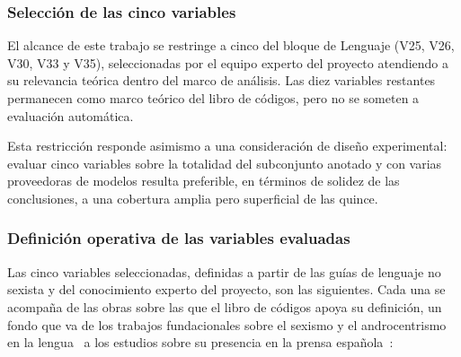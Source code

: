 \subsubsection{Selección de las cinco variables}

El alcance de este trabajo se restringe a cinco del bloque de Lenguaje (V25, V26, V30, V33 y
V35), seleccionadas por el equipo experto del proyecto atendiendo a su relevancia teórica dentro del marco de análisis. Las diez variables restantes permanecen como
marco teórico del libro de códigos, pero no se someten a evaluación automática.

Esta restricción responde asimismo a una consideración de diseño experimental:
evaluar cinco variables sobre la totalidad del subconjunto anotado y con varias
proveedoras de modelos resulta preferible, en términos de solidez de las
conclusiones, a una cobertura amplia pero superficial de las quince.

\subsubsection{Definición operativa de las variables evaluadas}
\label{sec:iris_variables}

Las cinco variables seleccionadas, definidas a partir de las guías de lenguaje no
sexista y del conocimiento experto del proyecto, son las siguientes. Cada una se
acompaña de las obras sobre las que el libro de códigos apoya su definición, un fondo
que va de los trabajos fundacionales sobre el sexismo y el androcentrismo en la
lengua~\cite{garciameseguer1977, garciameseguer1994, lledo1992, bengoechea2015} a los
estudios sobre su presencia en la prensa española~\cite{sainzdebaranda2013,
sainzdebaranda2014, bengoecheacalero2003}:

